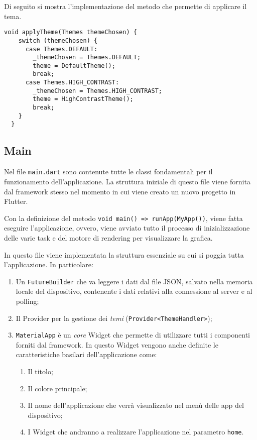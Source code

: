 Di seguito si mostra l'implementazione del metodo che permette di applicare il tema.
\begin{lstlisting}
void applyTheme(Themes themeChosen) {
    switch (themeChosen) {
      case Themes.DEFAULT:
        _themeChosen = Themes.DEFAULT;
        theme = DefaultTheme();
        break;
      case Themes.HIGH_CONTRAST:
        _themeChosen = Themes.HIGH_CONTRAST;
        theme = HighContrastTheme();
        break;
    }
  }
\end{lstlisting}

\subsection{Main}
Nel file \verb|main.dart| sono contenute tutte le classi fondamentali per il funzionamento dell'applicazione. La struttura iniziale di questo file viene fornita dal framework stesso nel momento in cui viene creato un nuovo progetto in Flutter.

Con la definizione del metodo \verb|void main() => runApp(MyApp())|, viene fatta eseguire l'applicazione, ovvero, viene avviato tutto il processo di inizializzazione delle varie task e del motore di rendering per visualizzare la grafica.

In questo file viene implementata la struttura essenziale su cui si poggia tutta l'applicazione. In particolare:
\begin{enumerate}
	\item Un \verb|FutureBuilder| che va leggere i dati dal file JSON, salvato nella memoria locale del dispositivo, contenente i dati relativi alla connessione al server e al polling;
	\item Il Provider per la gestione dei \textit{temi} (\verb|Provider<ThemeHandler>|);
	\item \verb|MaterialApp| è un \textit{core} Widget che permette di utilizzare tutti i componenti forniti dal framework. In questo Widget vengono anche definite le caratteristiche basilari dell'applicazione come:
	\begin{enumerate}
		\item Il titolo;
		\item Il colore principale;
		\item Il nome dell'applicazione che verrà visualizzato nel menù delle app del dispositivo;
		\item I Widget che andranno a realizzare l'applicazione nel parametro \verb|home|.
	\end{enumerate}
\end{enumerate}

